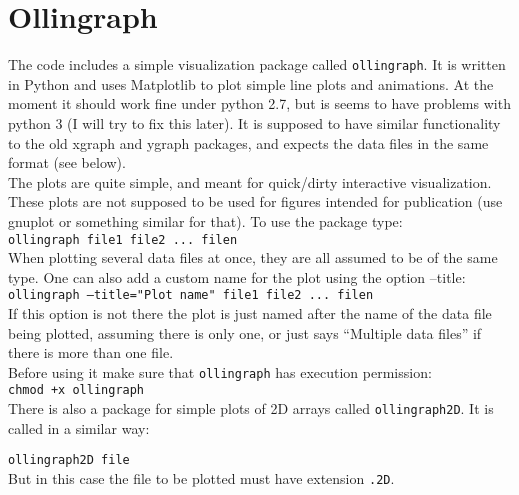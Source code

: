 \documentclass[12pt]{article}
\begin{document}

\section{Ollingraph}
\label{sec:ollingraph}

The code includes a simple visualization package called
\texttt{ollingraph}.  It is written in Python and uses Matplotlib to plot
simple line plots and animations.  At the moment it should work fine
under python 2.7, but is seems to have problems with python 3 (I will
try to fix this later). It is supposed to have similar functionality to
the old xgraph and ygraph packages, and expects the data files in the
same format (see below). \\

The plots are quite simple, and meant for quick/dirty interactive
visualization.  These plots are not supposed to be used for figures
intended for publication (use gnuplot or something similar for
that). To use the package type: \\

\texttt{ollingraph  file1 file2 ... filen} \\

When plotting several data files at once, they are all assumed to be
of the same type.  One can also add a custom name for the plot using
the option --title: \\

\texttt{ollingraph --title="Plot name" file1 file2 ... filen} \\

If this option is not there the plot is just named after the name of
the data file being plotted, assuming there is only one, or just says
``Multiple data files'' if there is more than one file. \\

Before using it make sure that \texttt{ollingraph} has execution
permission: \\

\texttt{chmod +x ollingraph} \\

There is also a package for simple plots of 2D arrays called
\texttt{ollingraph2D}. It is called in a similar way:

\texttt{ollingraph2D  file} \\

But in this case the file to be plotted must have extension
\texttt{.2D}.
\end{document}
